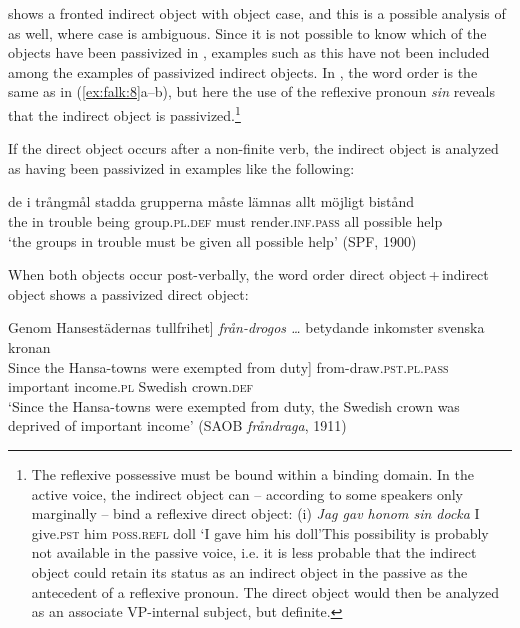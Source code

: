 \documentclass[output=paper]{langscibook}
\begin{document}
 shows a fronted indirect object with object case, and this is a possible analysis of  as well, where case is ambiguous. Since it is not possible to know which of the objects have been passivized in , examples such as this have not been included among the examples of passivized indirect objects. In , the word order is the same as in (\ref{ex:falk:8}a–b), but here the use of the reflexive pronoun \textit{sin} reveals that the indirect object is passivized.\footnote{The reflexive possessive must be bound within a binding domain. In the active voice, the indirect object can – according to some speakers only marginally – bind a reflexive direct object: (i)  \textit{Jag  gav    honom    sin    docka}  I      give.\textsc{pst}  him      \textsc{poss}.\textsc{refl}  doll  ‘I gave him his doll’This possibility is probably not available in the passive voice, i.e. it is less probable that the indirect object could retain its status as an indirect object in the passive as the antecedent of a reflexive pronoun. The direct object would then be analyzed as an associate VP-internal subject, but definite.}


If the direct object occurs after a non-finite verb, the indirect object is analyzed as having been passivized in examples like the following:

\ea%
    \label{ex:falk:9}
\gll de  i     trångmål  stadda  grupperna    måste  lämnas          allt  möjligt    bistånd\\
    the  in  trouble    being    group\textsc{.pl.def}   must  render\textsc{.inf}.\textsc{pass}  all    possible  help\\
\glt ‘the groups in trouble must be given all possible help’ (SPF, 1900)
\z


When both objects occur post-verbally, the word order direct object\,+\,indirect object shows a passivized direct object:

\ea%
    \label{ex:falk:10}
            {\ob}Genom Hansestädernas tullfrihet]               \textit{från-drogos …} betydande   inkomster  svenska    kronan \\
    {\ob}Since the Hansa-towns were exempted from duty]   from-draw\textsc{.pst.pl}.\textsc{pass}    important   income\textsc{.pl}  Swedish   crown.\textsc{def}\\
\glt ‘Since the Hansa-towns were exempted from duty, the Swedish crown was deprived of important income’ (SAOB \textit{fråndraga}, 1911)
\z
\end{document}
